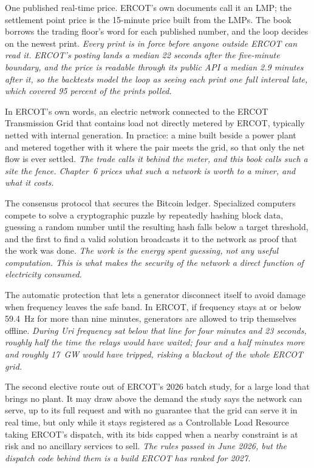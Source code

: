 \begin{description}[leftmargin=0pt,style=unboxed,itemsep=0.35em,parsep=0.15em]
\item[print] \hypertarget{glossary:print}{}One published real-time price. ERCOT's own documents call it an LMP; the settlement point price is the 15-minute price built from the LMPs. The book borrows the trading floor's word for each published number, and the loop decides on the newest print. \emph{Every print is in force before anyone outside ERCOT can read it. ERCOT's posting lands a median 22 seconds after the five-minute boundary, and the price is readable through its public API a median 2.9 minutes after it, so the backtests model the loop as seeing each print one full interval late, which covered 95 percent of the prints polled.}
\item[Private Use Network (PUN)] \hypertarget{glossary:private-use-network}{}In ERCOT's own words, an electric network connected to the ERCOT Transmission Grid that contains load not directly metered by ERCOT, typically netted with internal generation. In practice: a mine built beside a power plant and metered together with it where the pair meets the grid, so that only the net flow is ever settled. \emph{The trade calls it behind the meter, and this book calls such a site the fence. Chapter~6 prices what such a network is worth to a miner, and what it costs.}
\item[Proof-of-Work (PoW)] \hypertarget{glossary:proof-of-work}{}The consensus protocol that secures the Bitcoin ledger. Specialized computers compete to solve a cryptographic puzzle by repeatedly hashing block data, guessing a random number until the resulting hash falls below a target threshold, and the first to find a valid solution broadcasts it to the network as proof that the work was done. \emph{The work is the energy spent guessing, not any useful computation. This is what makes the security of the network a direct function of electricity consumed.}
\item[protective relay] \hypertarget{glossary:protective-relay}{}The automatic protection that lets a generator disconnect itself to avoid damage when frequency leaves the safe band. In ERCOT, if frequency stays at or below 59.4~Hz for more than nine minutes, generators are allowed to trip themselves offline. \emph{During Uri frequency sat below that line for four minutes and 23 seconds, roughly half the time the relays would have waited; four and a half minutes more and roughly 17~GW would have tripped, risking a blackout of the whole ERCOT grid.}
\item[Provisional Controllable Load Resource (PCLR)] \hypertarget{glossary:provisional-controllable-load-resource}{}The second elective route out of ERCOT's 2026 batch study, for a large load that brings no plant. It may draw above the demand the study says the network can serve, up to its full request and with no guarantee that the grid can serve it in real time, but only while it stays registered as a Controllable Load Resource taking ERCOT's dispatch, with its bids capped when a nearby constraint is at risk and no ancillary services to sell. \emph{The rules passed in June 2026, but the dispatch code behind them is a build ERCOT has ranked for 2027.}

\end{description}
